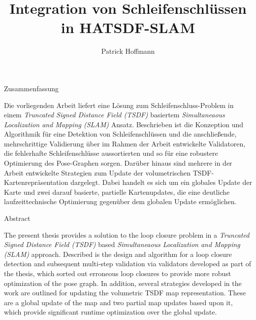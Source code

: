 \documentclass[german, master, utf8, pdftex, dvipsnames]{base/thesis_KBS}
\begin{document}
\title{Integration von Schleifenschlüssen in HATSDF-SLAM} %

\author{Patrick Hoffmann}

\generatetitle

\cleardoublepage

\begin{prefacesection}{Zusammenfassung}

Die vorliegenden Arbeit liefert eine Lösung zum Schleifenschluss-Problem in einem \emph{Truncated Signed Distance Field (TSDF)} basiertem \emph{Simultaneaous Localization and Mapping (SLAM)} Ansatz. Beschrieben ist die Konzeption und Algorithmik für eine Detektion von Schleifenschlüssen und die anschließende, mehrschrittige Validierung über im Rahmen der Arbeit entwickelte Validatoren, die fehlerhafte Schleifenschlüsse aussortierten und so für eine robustere Optimierung des Pose-Graphen sorgen. Darüber hinaus sind mehrere in der Arbeit entwickelte Strategien zum Update der volumetrischen TSDF-Kartenrepräsentation dargelegt. Dabei handelt es sich um ein globales Update der Karte und zwei darauf basierte, partielle Kartenupdates, die eine deutliche laufzeittechnische Optimierung gegenüber dem globalen Update ermöglichen.

\end{prefacesection}

\vspace{5cm}

\begin{prefacesection}{Abstract}

The present thesis provides a solution to the loop closure problem in a \emph{Truncated Signed Distance Field (TSDF)} based \emph{Simultaneaous Localization and Mapping (SLAM)} approach. Described is the design and algorithm for a loop closure detection and subsequent multi-step validation via validators developed as part of the thesis, which sorted out erroneous loop closures to provide more robust optimization of the pose graph. In addition, several strategies developed in the work are outlined for updating the volumetric TSDF map representation. These are a global update of the map and two partial map updates based upon it, which provide significant runtime optimization over the global update.

\end{prefacesection}
\end{document}
